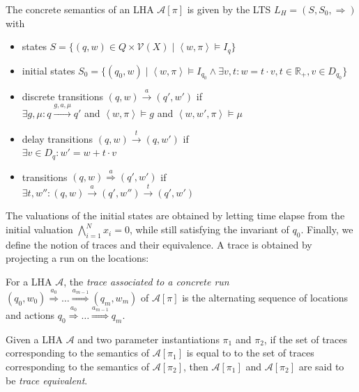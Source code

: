 \documentclass{llncs}
\newcommand{\todo}[1]{{\bf \textcolor{red}{[#1]}}}
\newcommand{\A}{\ensuremath{\mathcal{A}}}
\newcommand{\Reals}{\ensuremath{\mathbb{R}}}
\newcommand{\trans}[1]{\ensuremath{\overset{#1}{\rightarrow}}}
\newcommand{\Trans}[1]{\ensuremath{\overset{#1}{\Rightarrow}}}
\newcommand{\valuation}{\ensuremath{\mathcal{V}}}
\begin{document}
\begin{definition}\label{def:csem}
  The concrete semantics of an LHA $\A[\pi]$ is given by the
  LTS $L_H = (S, S_0, \Rightarrow)$ with
  \begin{itemize}
    \item states $S = \{ (q,w) \in Q \times \valuation(X) \mid \left< w, \pi \right> \models I_q \}$
    \item initial states $S_0 = \{(q_0, w) \mid \left<w, \pi \right> \models I_{q_0} \wedge \exists v, t: w = t \cdot v, t \in \Reals_{+}, v \in D_{q_0} \}$
    \item discrete transitions $(q,w) \trans{a} (q', w')$ if \\ $\exists g,\mu: q \xrightarrow{g, a, \mu} q'$ and $\left<w,\pi\right> \models g$ and $\left< w, w', \pi\right> \models \mu$
    \item delay transitions $(q,w) \trans{t} (q,w')$ if \\ $\exists v \in D_q: w' = w + t \cdot v$
    \item transitions $(q,w) \Trans{a} (q',w')$ if \\ $\exists t,w'': (q,w) \trans{a} (q',w'') \trans{t} (q',w')$
  \end{itemize}
\end{definition}

The valuations of the initial states are obtained by letting time
elapse from the initial valuation $\bigwedge_{i = 1}^{N} x_i = 0$, while
still satisfying the invariant of $q_0$. Finally, we define the notion
of traces and their equivalence. A trace is obtained by projecting a
run on the locations:

\begin{definition}
  For a LHA $\A$, the \emph{trace associated to a concrete run}
  $(q_0, w_0) \Trans{a_0} \dots \Trans{a_{m-1}} (q_m, w_m)$ of
  $\A[\pi]$ is the alternating sequence of locations and actions 
$q_0 \Trans{a_0} \dots \Trans{a_{m-1}} q_m$.
\end{definition}
\begin{definition}
  Given a LHA $\A$ and two parameter instantiations $\pi_1$ and $\pi_2$,
  if the set of traces corresponding to the semantics of
$\A[\pi_1]$ is equal to to the set of traces corresponding to the semantics
of $\A[\pi_2]$, then  $\A[\pi_1]$ and $\A[\pi_2]$
  are said to be \emph{trace equivalent}. 
\end{definition}
\end{document}
